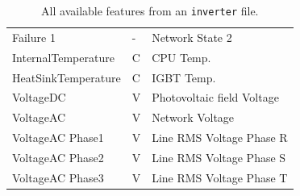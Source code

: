 \begin{table}[H]
\begin{center}
\begin{tabular}[c]{l|l|l}
			Failure 1                                 & -   & Network State  2           \\
			InternalTemperature                       & C   & CPU Temp.                  \\
			HeatSinkTemperature                       & C   & IGBT Temp.                 \\
			VoltageDC                                 & V   & Photovoltaic field Voltage \\
			VoltageAC                                 & V   & Network Voltage            \\
			VoltageAC Phase1                          & V   & Line RMS Voltage Phase R   \\
			VoltageAC Phase2                          & V   & Line RMS Voltage Phase S   \\
			VoltageAC Phase3                          & V   & Line RMS Voltage Phase T   \\
			\hline
		\end{tabular}
		\caption{All available features from an \texttt{inverter} file.}\label{tab:invfeatures}
	\end{center}
\end{table}

